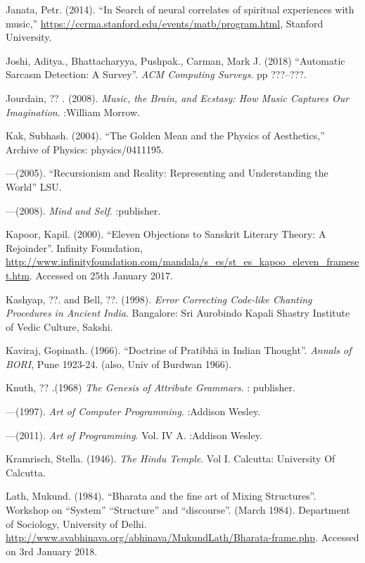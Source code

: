 \begin{thebibliography}{99}
Janata, Petr. (2014). “In Search of neural correlates of spiritual experiences with music,” \url{https://ccrma.stanford.edu/events/matb/program.html}, Stanford University.

Joshi, Aditya., Bhattacharyya, Pushpak., Carman, Mark J. (2018) “Automatic Sarcasm Detection: A Survey”. \textsl{ACM Computing Surveys}. pp ???--???.

Jourdain, ?? . (2008). \textsl{Music, the Brain, and Ecstasy: How Music Captures Our Imagination}. :William Morrow.

Kak, Subhash. (2004). “The Golden Mean and the Physics of Aesthetics,” Archive of Physics: physics/0411195.

---\kern3pt(2005). “Recursionism and Reality: Representing and Understanding the World” LSU.

---\kern3pt(2008). \textsl{Mind and Self}. :publisher.

Kapoor, Kapil. (2000). “Eleven Objections to Sanskrit Literary Theory: A Rejoinder”. Infinity Foundation, \url{http://www.infinityfoundation.com/mandala/s_es/st_es_kapoo_eleven_frameset.htm}. Accessed on 25th January 2017.

Kashyap, ??. and Bell, ??. (1998). \textsl{Error Correcting Code-like Chanting Procedures in Ancient India}. Bangalore: Sri Aurobindo Kapali Shastry Institute of Vedic Culture, Sakshi.

Kaviraj, Gopinath. (1966). “Doctrine of Pratibhā in Indian Thought”. \textsl{Annals of BORI}, Pune 1923-24. (also, Univ of Burdwan 1966).

Knuth, ?? .(1968) \textsl{The Genesis of Attribute Grammars}. : publisher.

---\kern3pt(1997). \textsl{Art of Computer Programming}. :Addison Wesley.

---\kern3pt(2011). \textsl{Art of Programming}. Vol. IV A. :Addison Wesley.

Kramrisch, Stella. (1946). \textsl{The Hindu Temple}. Vol I. Calcutta: University Of Calcutta.

Lath, Mukund. (1984). “Bharata and the fine art of Mixing Structures”. Workshop on “System” “Structure” and “discourse”. (March 1984). Department of Sociology, University of Delhi. \url{http://www.svabhinava.org/abhinava/MukundLath/Bharata-frame.php}. Accessed on 3rd January 2018.


\end{thebibliography}
